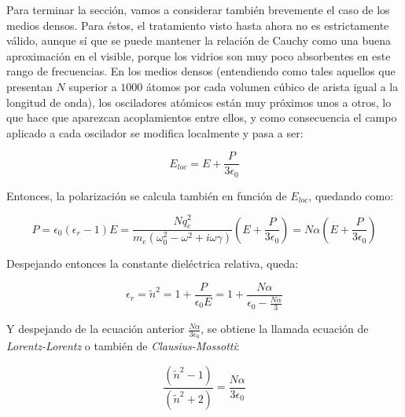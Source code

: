 \documentclass[12pt,a4paper]{report}
\newcommand{\esp}{\vspace{0.5cm}}
\begin{document}
	\esp
	
	Para terminar la sección, vamos a considerar también brevemente el caso de los medios densos. Para éstos, el tratamiento visto hasta ahora no es estrictamente válido, aunque sí que se puede mantener la relación de Cauchy como una buena aproximación en el visible, porque los vidrios son muy poco absorbentes en este rango de frecuencias. En los medios densos (entendiendo como tales aquellos que presentan $N$ superior a $1000$ átomos por cada volumen cúbico de arista igual a la longitud de onda), los osciladores atómicos están muy próximos unos a otros, lo que hace que aparezcan acoplamientos entre ellos, y como consecuencia el campo aplicado a cada oscilador se modifica localmente y pasa a ser:

	\begin{equation}
		E_{loc} = E + \frac{P}{3\epsilon_0}
	\end{equation}
	
	\esp
	
	Entonces, la polarización se calcula también en función de $E_{loc}$, quedando como:
	
	\esp
	
	\begin{equation}
		P = \epsilon_0 (\epsilon_r - 1) E = \frac{N q_e^2}{m_e (\omega_0^2 - \omega^2 + i\omega\gamma)} \left( E + \frac{P}{3\epsilon_0} \right) = N \alpha \left( E + \frac{P}{3\epsilon_0} \right)
	\end{equation}
	
	\esp
	
	Despejando entonces la constante dieléctrica relativa, queda:
	
	\esp
	
	\begin{equation}
		\epsilon_r = \tilde{n}^2 = 1 + \frac{P}{\epsilon_0 E} = 1 + \frac{N\alpha}{\epsilon_0 - \frac{N\alpha}{3}}
	\end{equation}
	
	\esp
	
	Y despejando de la ecuación anterior $\frac{N\alpha}{3\epsilon_0}$, se obtiene la llamada ecuación de \textit{Lorentz-Lorentz} o también de \textit{Clausius-Mossotti}:
	
	\esp
	
	\begin{equation}
		\frac{(\tilde{n}^2 - 1)}{(\tilde{n}^2 + 2)} = \frac{N\alpha}{3\epsilon_0}
	\end{equation}
	
	\esp
	
\end{document}
